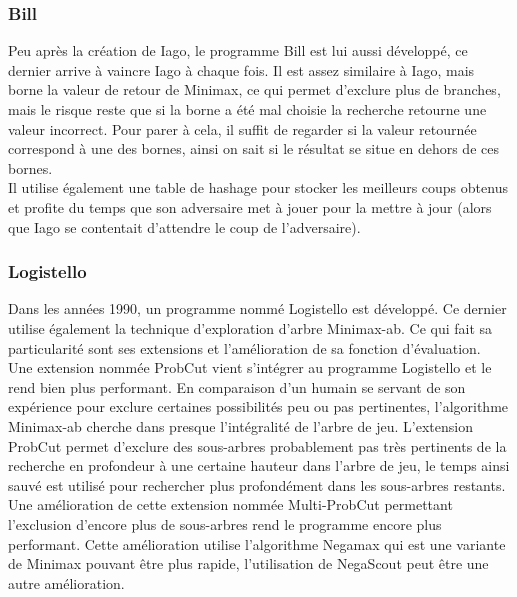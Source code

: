 \documentclass[10pt,a4paper]{article}
\begin{document}
\subsubsection{Bill}

Peu après la création de Iago, le programme Bill\cite{LM86} est lui aussi développé, ce dernier arrive à vaincre Iago à chaque fois. Il est assez similaire à Iago, mais borne la valeur de retour de Minimax, ce qui permet d'exclure plus de branches, mais le risque reste que si la borne a été mal choisie la recherche retourne une valeur incorrect. Pour parer à cela, il suffit de regarder si la valeur retournée correspond à une des bornes, ainsi on sait si le résultat se situe en dehors de ces bornes.\\

Il utilise également une table de hashage pour stocker les meilleurs coups obtenus et profite du temps que son adversaire met à jouer pour la mettre à jour (alors que Iago se contentait d'attendre le coup de l'adversaire).

\subsubsection{Logistello}

Dans les années 1990, un programme nommé Logistello\cite{Bur95a} est développé. Ce dernier utilise également la technique d'exploration d'arbre Minimax-ab. Ce qui fait sa particularité sont ses extensions et l'amélioration de sa fonction d'évaluation.\\

Une extension nommée ProbCut\cite{Bur95b} vient s'intégrer au programme Logistello et le rend bien plus performant. En comparaison d'un humain se servant de son expérience pour exclure certaines possibilités peu ou pas pertinentes, l'algorithme Minimax-ab cherche dans presque l'intégralité de l'arbre de jeu. L'extension ProbCut permet d'exclure des sous-arbres probablement pas très pertinents de la recherche en profondeur à une certaine hauteur dans l'arbre de jeu, le temps ainsi sauvé est utilisé pour rechercher plus profondément dans les sous-arbres restants.\\

Une amélioration de cette extension nommée Multi-ProbCut\cite{Bur97a} permettant l'exclusion d'encore plus de sous-arbres rend le programme encore plus performant. Cette amélioration utilise l'algorithme Negamax qui est une variante de Minimax pouvant être plus rapide, l'utilisation de NegaScout peut être une autre amélioration.\\
\end{document}
